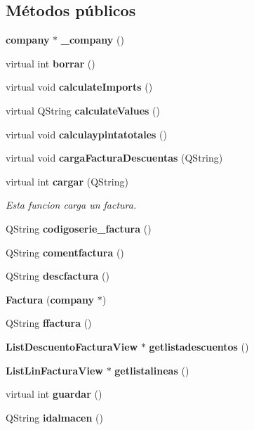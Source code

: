 \subsection*{M\'{e}todos p\'{u}blicos}
\begin{CompactItemize}
\item 
{\bf company} $\ast$ {\bf \_\-company} ()\label{classFactura_a0}

\item 
virtual int {\bf borrar} ()\label{classFactura_a1}

\item 
virtual void {\bf calculate\-Imports} ()\label{classFactura_a2}

\item 
virtual QString {\bf calculate\-Values} ()\label{classFactura_a3}

\item 
virtual void {\bf calculaypintatotales} ()
\item 
virtual void {\bf carga\-Factura\-Descuentas} (QString)\label{classFactura_a5}

\item 
virtual int {\bf cargar} (QString)\label{classFactura_a6}

\begin{CompactList}\small\item\em Esta funcion carga un factura. \item\end{CompactList}\item 
QString {\bf codigoserie\_\-factura} ()\label{classFactura_a7}

\item 
QString {\bf comentfactura} ()\label{classFactura_a8}

\item 
QString {\bf descfactura} ()\label{classFactura_a9}

\item 
{\bf Factura} ({\bf company} $\ast$)\label{classFactura_a10}

\item 
QString {\bf ffactura} ()\label{classFactura_a11}

\item 
{\bf List\-Descuento\-Factura\-View} $\ast$ {\bf getlistadescuentos} ()\label{classFactura_a12}

\item 
{\bf List\-Lin\-Factura\-View} $\ast$ {\bf getlistalineas} ()\label{classFactura_a13}

\item 
virtual int {\bf guardar} ()
\item 
QString {\bf idalmacen} ()\label{classFactura_a15}


\end{CompactItemize}
